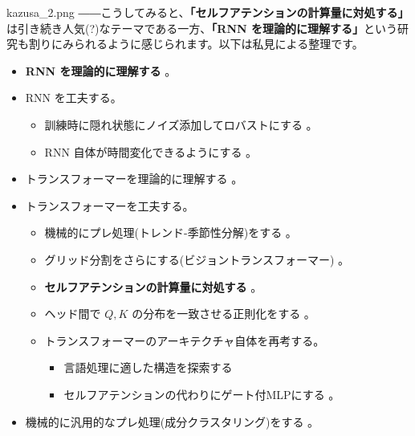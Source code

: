 \documentclass[b5paper,xelatex,ja=standard,10pt]{bxjsarticle}
\begin{document}
\begin{SERIFU}[colback=PaleIris]{kazusa_2.png}
――こうしてみると、\textbf{「セルフアテンションの計算量に対処する」}は引き続き人気(?)なテーマである一方、\textbf{「RNN を理論的に理解する」}という研究も割りにみられるように感じられます。以下は私見による整理です。
\begin{itemize}
  \item \textbf{RNN を理論的に理解する} \cite{05_Fermanian2021} \cite{18_Smith2021} \cite{21_Wang2021} \cite{22_Panigrahi2021}。
  \item RNN を工夫する。
  \begin{itemize}
    \item 訓練時に隠れ状態にノイズ添加してロバストにする \cite{06_Lim2021}。
    \item RNN 自体が時間変化できるようにする \cite{09_Zhang2021}。
  \end{itemize}

  \vspace{5pt}
  \item トランスフォーマーを理論的に理解する \cite{02_Panahi2021} \cite{16_Bricken2021}。
  \item トランスフォーマーを工夫する。
  \begin{itemize}
    \item 機械的にプレ処理(トレンド-季節性分解)をする \cite{23_Wu2021}。
    \item グリッド分割をさらにする(ビジョントランスフォーマー) \cite{17_Han2021}。
    \item \textbf{セルフアテンションの計算量に対処する} \cite{03_Chen2021} \cite{04_Ma2021} \cite{07_Dutta2021} \cite{11_Jaszczur2021} \cite{19_Chen2021} \cite{20_Zhu2021} \cite{24_Ren2021} \cite{25_Luo2021}。
    \item ヘッド間で $Q, K$ の分布を一致させる正則化をする \cite{15_Zhang2021}。
    \item トランスフォーマーのアーキテクチャ自体を再考する。
    \begin{itemize}
      \item 言語処理に適した構造を探索する \cite{08_So2021}
      \item セルフアテンションの代わりにゲート付MLPにする \cite{10_Liu2021}。
    \end{itemize}
  \end{itemize}

  \vspace{5pt}
  \item 機械的に汎用的なプレ処理(成分クラスタリング)をする \cite{14_Zhu2021}。


\end{itemize}
\end{SERIFU}
\end{document}
